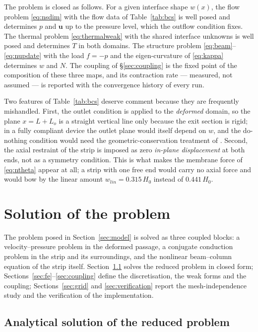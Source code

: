 \documentclass[11pt,a4paper]{article}
\newcommand{\bu}{\mathbf u}
\begin{document}
The problem is closed as follows. For a given interface shape $w(x)$, the
flow problem \eqref{eq:nsdim} with the flow data of Table~\ref{tab:bcs} is
well posed and determines $p$ and $\bu$ up to the pressure level, which the
outflow condition fixes. The thermal problem \eqref{eq:thermalweak} with the
shared interface unknowns is well posed and determines $T$ in both domains.
The structure problem \eqref{eq:beam}--\eqref{eq:nupdate} with the load $f=-p$
and the eigen-curvature of \eqref{eq:kappa} determines $w$ and $N$. The
coupling of \S\ref{sec:coupling} is the fixed point of the composition of
these three maps, and its contraction rate --- measured, not assumed --- is
reported with the convergence history of every run.

Two features of Table~\ref{tab:bcs} deserve comment because they are
frequently mishandled. First, the outlet condition is applied to the
\emph{deformed} domain, so the plane $x=L+L_o$ is a straight vertical line only
because the exit section is rigid; in a fully compliant device the outlet
plane would itself depend on $w$, and the do-nothing condition would need the
geometric-conservation treatment of \citet{lesoinne1996geometric}. Second, the
axial restraint of the strip is imposed as zero \emph{in-plane displacement}
at both ends, not as a symmetry condition. This is what makes the membrane
force of \eqref{eq:ntheta} appear at all; a strip with one free end would
carry no axial force and would bow by the linear amount
$w_{lin}=0.315\,H_0$ instead of $0.441\,H_0$.


\section{Solution of the problem}
\label{sec:numerics}

The problem posed in Section~\ref{sec:model} is solved as three coupled
blocks: a velocity--pressure problem in the deformed passage, a conjugate
conduction problem in the strip and its surroundings, and the nonlinear
beam--column equation of the strip itself. Section~\ref{sec:analytical} solves the reduced problem in closed form;
Sections~\ref{sec:fe}--\ref{sec:coupling} define the discretisation, the weak forms and
the coupling; Sections~\ref{sec:grid} and \ref{sec:verification} report the
mesh-independence study and the verification of the implementation.

\subsection{Analytical solution of the reduced problem}
\label{sec:analytical}
\end{document}
